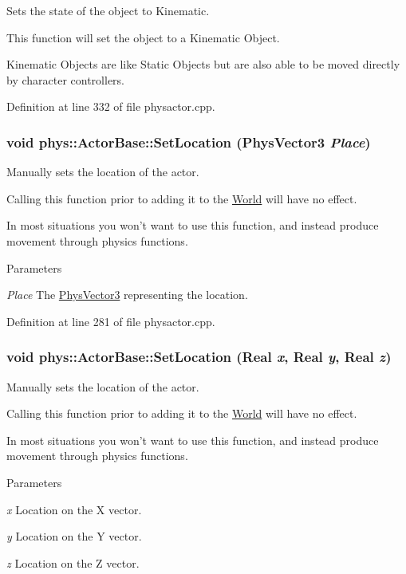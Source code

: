 Sets the state of the object to Kinematic. 

This function will set the object to a Kinematic Object. \par
 Kinematic Objects are like Static Objects but are also able to be moved directly by character controllers. 

Definition at line 332 of file physactor.cpp.

\hypertarget{classphys_1_1ActorBase_a9a182b7262742ab5d499e7a51d407044}{
\subsubsection[{SetLocation}]{\setlength{\rightskip}{0pt plus 5cm}void phys::ActorBase::SetLocation ({\bf PhysVector3} {\em Place})}}
\label{d8/d0f/classphys_1_1ActorBase_a9a182b7262742ab5d499e7a51d407044}


Manually sets the location of the actor. 

Calling this function prior to adding it to the \hyperlink{classphys_1_1World}{World} will have no effect. \par
 In most situations you won't want to use this function, and instead produce movement through physics functions. 
\begin{DoxyParams}{Parameters}
\item[{\em Place}]The \hyperlink{classPhysVector3}{PhysVector3} representing the location. \end{DoxyParams}


Definition at line 281 of file physactor.cpp.

\hypertarget{classphys_1_1ActorBase_a0b0db2ec0f4926326635b86f1ead2276}{
\subsubsection[{SetLocation}]{\setlength{\rightskip}{0pt plus 5cm}void phys::ActorBase::SetLocation ({\bf Real} {\em x}, \/  {\bf Real} {\em y}, \/  {\bf Real} {\em z})}}
\label{d8/d0f/classphys_1_1ActorBase_a0b0db2ec0f4926326635b86f1ead2276}


Manually sets the location of the actor. 

Calling this function prior to adding it to the \hyperlink{classphys_1_1World}{World} will have no effect. \par
 In most situations you won't want to use this function, and instead produce movement through physics functions. 
\begin{DoxyParams}{Parameters}
\item[{\em x}]Location on the X vector. \item[{\em y}]Location on the Y vector. \item[{\em z}]Location on the Z vector. \end{DoxyParams}


